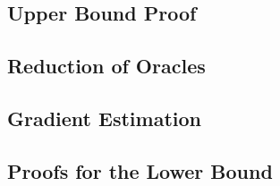 
\subsection{Upper Bound Proof}
\label{sec:appendix-md}


\subsection{Reduction of Oracles}
\label{sec:orrel}


\subsection{Gradient Estimation}
\label{sec:appendix-grad}


\subsection{Proofs for the Lower Bound}
\label{sec:appendix-lb-proof}



